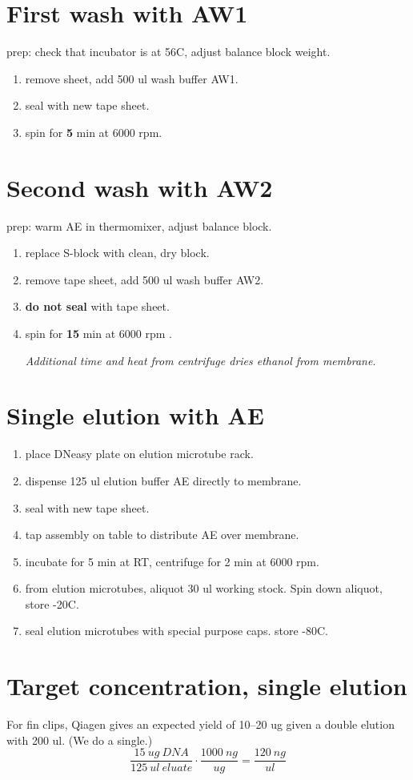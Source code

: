 \documentclass{article}
\begin{document}
\section*{First wash with AW1}
prep: check that incubator is at 56C, adjust balance block weight.
\begin{enumerate}
    \item remove sheet, add 500 ul wash buffer AW1.
    \item seal with new tape sheet.
    \item spin for \textbf{5} min at 6000 rpm.
\end{enumerate}

\section*{Second wash with AW2}
prep: warm AE in thermomixer, adjust balance block.

\begin{enumerate}
    \item replace S-block with clean, dry block.
    \item remove tape sheet, add 500 ul wash buffer AW2.
    \item \textbf{do not seal} with tape sheet.
    \item spin for \textbf{15} min at 6000 rpm .
    \begin{center}
            \emph{Additional time and heat from centrifuge dries ethanol from membrane.}
    \end{center}
\end{enumerate}

\section*{Single elution with AE}
\begin{enumerate}
    \item place DNeasy plate on elution microtube rack.
    \item dispense 125 ul elution buffer AE directly to membrane.
    \item seal with new tape sheet.
    \item tap assembly on table to distribute AE over membrane.
    \item incubate for 5 min at RT, centrifuge for 2 min at 6000 rpm.
    \item from elution microtubes, aliquot 30 ul working stock. Spin down aliquot, store -20C.
    \item seal elution microtubes with special purpose caps. store -80C.
\end{enumerate}

\section*{Target concentration, single elution}
For fin clips, Qiagen gives an expected yield of 10--20 ug given a double elution with 200 ul. (We do a single.)
$$\frac{15 \ ug \ DNA}{125 \ ul \ eluate} \cdot \frac{1000 \ ng}{ug} = \frac{120 \ ng}{ul}$$
\end{document}
